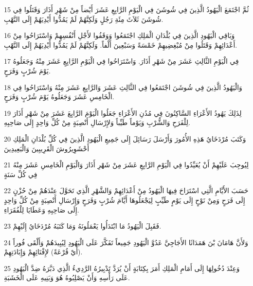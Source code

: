 \par 15 ثُمَّ اجْتَمَعَ الْيَهُودُ الَّذِينَ فِي شُوشَنَ فِي الْيَوْمِ الرَّابِعِ عَشَرَ أَيْضاً مِنْ شَهْرِ أَذَارَ وَقَتَلُوا فِي شُوشَنَ ثَلاَثَ مِئَةِ رَجُلٍ وَلَكِنَّهُمْ لَمْ يَمُدُّوا أَيْدِيَهُمْ إِلَى النَّهْبِ.
\par 16 وَبَاقِي الْيَهُودِ الَّذِينَ فِي بُلْدَانِ الْمَلِكِ اجْتَمَعُوا وَوَقَفُوا لأَجْلِ أَنْفُسِهِمْ وَاسْتَرَاحُوا مِنْ أَعْدَائِهِمْ وَقَتَلُوا مِنْ مُبْغِضِيهِمْ خَمْسَةً وَسَبْعِينَ أَلْفاً. وَلَكِنَّهُمْ لَمْ يَمُدُّوا أَيْدِيَهُمْ إِلَى النَّهْبِ.
\par 17 فِي الْيَوْمِ الثَّالِثِ عَشَرَ مِنْ شَهْرِ أَذَارَ. وَاسْتَرَاحُوا فِي الْيَوْمِ الرَّابِعِ عَشَرَ مِنْهُ وَجَعَلُوهُ يَوْمَ شُرْبٍ وَفَرَحٍ.
\par 18 وَالْيَهُودُ الَّذِينَ فِي شُوشَنَ اجْتَمَعُوا فِي الثَّالِثِ عَشَرَ وَالرَّابِعِ عَشَرَ مِنْهُ وَاسْتَرَاحُوا فِي الْخَامِسِ عَشَرَ وَجَعَلُوهُ يَوْمَ شُرْبٍ وَفَرَحٍ.
\par 19 لِذَلِكَ يَهُودُ الأَعْرَاءِ السَّاكِنُونَ فِي مُدُنِ الأَعْرَاءِ جَعَلُوا الْيَوْمَ الرَّابِعَ عَشَرَ مِنْ شَهْرِ أَذَارَ لِلْفَرَحِ وَالشُّرْبِ وَيَوْماً طَيِّباً وَلإِرْسَالِ أَنْصِبَةٍ مِنْ كُلِّ وَاحِدٍ إِلَى صَاحِبِهِ.
\par 20 وَكَتَبَ مُرْدَخَايُ هَذِهِ الأُمُورَ وَأَرْسَلَ رَسَائِلَ إِلَى جَمِيعِ الْيَهُودِ الَّذِينَ فِي كُلِّ بُلْدَانِ الْمَلِكِ أَحْشَوِيرُوشَ الْقَرِيبِينَ وَالْبَعِيدِينَ
\par 21 لِيُوجِبَ عَلَيْهِمْ أَنْ يُعَيِّدُوا فِي الْيَوْمِ الرَّابِعِ عَشَرَ مِنْ شَهْرِ أَذَارَ وَالْيَوْمِ الْخَامِسِ عَشَرَ مِنْهُ فِي كُلِّ سَنَةٍ
\par 22 حَسَبَ الأَيَّامِ الَّتِي اسْتَرَاحَ فِيهَا الْيَهُودُ مِنْ أَعْدَائِهِمْ وَالشَّهْرِ الَّذِي تَحَوَّلَ عِنْدَهُمْ مِنْ حُزْنٍ إِلَى فَرَحٍ وَمِنْ نَوْحٍ إِلَى يَوْمٍ طَيِّبٍ لِيَجْعَلُوهَا أَيَّامَ شُرْبٍ وَفَرَحٍ وَإِرْسَالِ أَنْصِبَةٍ مِنْ كُلِّ وَاحِدٍ إِلَى صَاحِبِهِ وَعَطَايَا لِلْفُقَرَاءِ.
\par 23 فَقَبِلَ الْيَهُودُ مَا ابْتَدَأُوا يَعْمَلُونَهُ وَمَا كَتَبَهُ مُرْدَخَايُ إِلَيْهِمْ.
\par 24 وَلأَنَّ هَامَانَ بْنَ هَمَدَاثَا الأَجَاجِيَّ عَدُوَّ الْيَهُودِ جَمِيعاً تَفَكَّرَ عَلَى الْيَهُودِ لِيُبِيدَهُمْ وَأَلْقَى فُوراً (أَيْ قُرْعَةً) لإِفْنَائِهِمْ وَإِبَادَتِهِمْ.
\par 25 وَعِنْدَ دُخُولِهَا إِلَى أَمَامِ الْمَلِكِ أَمَرَ بِكِتَابَةٍ أَنْ يُرَدَّ تَدْبِيرُهُ الرَّدِيءُ الَّذِي دَبَّرَهُ ضِدَّ الْيَهُودِ عَلَى رَأْسِهِ وَأَنْ يَصْلِبُوهُ هُوَ وَبَنِيهِ عَلَى الْخَشَبَةِ.
